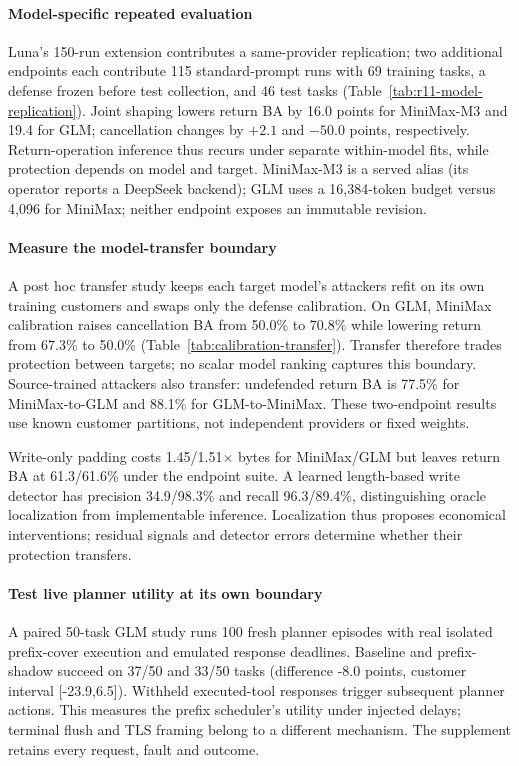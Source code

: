 \paragraph{Model-specific repeated evaluation}
Luna's 150-run extension contributes a same-provider replication; two additional endpoints each contribute 115 standard-prompt runs with 69 training tasks, a defense frozen before test collection, and 46 test tasks (Table~\ref{tab:r11-model-replication}). Joint shaping lowers return BA by 16.0 points for MiniMax-M3 and 19.4 for GLM; cancellation changes by $+2.1$ and $-50.0$ points, respectively. Return-operation inference thus recurs under separate within-model fits, while protection depends on model and target. MiniMax-M3 is a served alias (its operator reports a DeepSeek backend); GLM uses a 16,384-token budget versus 4,096 for MiniMax; neither endpoint exposes an immutable revision.

\paragraph{Measure the model-transfer boundary}
A post hoc transfer study keeps each target model's attackers refit on its own training customers and swaps only the defense calibration. On GLM, MiniMax calibration raises cancellation BA from 50.0\% to 70.8\% while lowering return from 67.3\% to 50.0\% (Table~\ref{tab:calibration-transfer}). Transfer therefore trades protection between targets; no scalar model ranking captures this boundary. Source-trained attackers also transfer: undefended return BA is 77.5\% for MiniMax-to-GLM and 88.1\% for GLM-to-MiniMax. These two-endpoint results use known customer partitions, not independent providers or fixed weights.

Write-only padding costs 1.45/1.51$\times$ bytes for MiniMax/GLM but leaves return BA at 61.3/61.6\% under the endpoint suite. A learned length-based write detector has precision 34.9/98.3\% and recall 96.3/89.4\%, distinguishing oracle localization from implementable inference. Localization thus proposes economical interventions; residual signals and detector errors determine whether their protection transfers.

\paragraph{Test live planner utility at its own boundary}
A paired 50-task GLM study runs 100 fresh planner episodes with real isolated prefix-cover execution and emulated response deadlines. Baseline and prefix-shadow succeed on 37/50 and 33/50 tasks (difference -8.0 points, customer interval [-23.9,6.5]). Withheld executed-tool responses trigger subsequent planner actions. This measures the prefix scheduler's utility under injected delays; terminal flush and TLS framing belong to a different mechanism. The supplement retains every request, fault and outcome.

